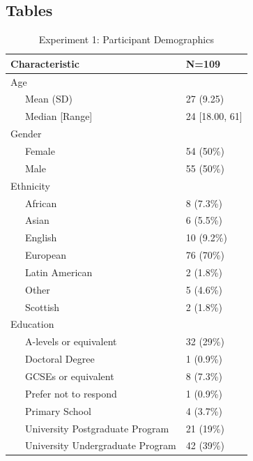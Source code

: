 \documentclass[
  donotrepeattitle,doc, 12pt, a4paper,floatsintext]{apa7}
\begin{document}
\newpage
\hypertarget{tables}{%
\subsection{Tables}\label{tables}}
\begin{table}[h]
\begin{center}
\begin{threeparttable}
\caption{\label{tab:unnamed-chunk-2}Experiment 1: Participant Demographics}
\begin{tabular}{ll}
\toprule
Characteristic & N=109\\
\midrule
Age & \\
\ \ \ Mean (SD) & 27 (9.25)\\
\ \ \ Median [Range] & 24 [18.00, 61]\\
Gender & \\
\ \ \ Female & 54 (50\%)\\
\ \ \ Male & 55 (50\%)\\
Ethnicity & \\
\ \ \ African & 8 (7.3\%)\\
\ \ \ Asian & 6 (5.5\%)\\
\ \ \ English & 10 (9.2\%)\\
\ \ \ European & 76 (70\%)\\
\ \ \ Latin American & 2 (1.8\%)\\
\ \ \ Other & 5 (4.6\%)\\
\ \ \ Scottish & 2 (1.8\%)\\
Education & \\
\ \ \ A-levels or equivalent & 32 (29\%)\\
\ \ \ Doctoral Degree & 1 (0.9\%)\\
\ \ \ GCSEs or equivalent & 8 (7.3\%)\\
\ \ \ Prefer not to respond & 1 (0.9\%)\\
\ \ \ Primary School & 4 (3.7\%)\\
\ \ \ University Postgraduate Program & 21 (19\%)\\
\ \ \ University Undergraduate Program & 42 (39\%)\\
\bottomrule
\end{tabular}
\end{threeparttable}
\end{center}
\end{table}
\end{document}
